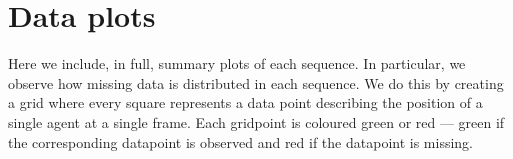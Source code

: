\fancyhead[RO]{\textsc{\leftmark}\quad\thepage}
\fancyhead[LE]{\thepage\quad\textsc{\appendixname~\thechapter}}

\graphicspath{{fig/data_plots/}}

\chapter{Data plots}
\label{cha:data_plots}

Here we include, in full, summary plots of each sequence. In particular, we observe how missing data is distributed in each sequence. We do this by creating a grid where every square represents a data point describing the position of a single agent at a single frame. Each gridpoint is coloured green or red --- green if the corresponding datapoint is observed and red if the datapoint is missing.

